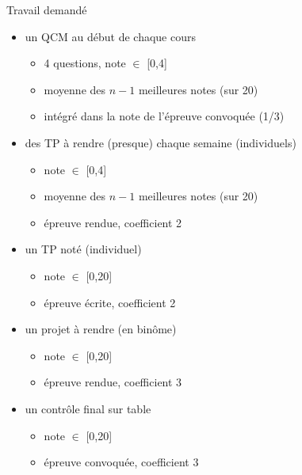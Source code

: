\begin {frame} {Travail demandé}
    \begin {itemize}
	\item un QCM au début de chaque cours
	    \begin {itemize}
		\item 4 questions, note $\in$ [0,4]
		\item moyenne des $n-1$ meilleures notes (sur 20)
		\item intégré dans la note de l'épreuve convoquée (1/3)
	    \end {itemize}
	\item des TP à rendre (presque) chaque semaine (individuels)
	    \begin {itemize}
		\item note $\in$ [0,4]
		\item moyenne des $n-1$ meilleures notes (sur 20)
		\item épreuve rendue, coefficient 2
	    \end {itemize}
	\item un TP noté (individuel)
	    \begin {itemize}
		\item note $\in$ [0,20]
		\item épreuve écrite, coefficient 2
	    \end {itemize}
	\item un projet à rendre (en binôme)
	    \begin {itemize}
		\item note $\in$ [0,20]
		\item épreuve rendue, coefficient 3
	    \end {itemize}
	\item un contrôle final sur table
	    \begin {itemize}
		\item note $\in$ [0,20]
		\item épreuve convoquée, coefficient 3
	    \end {itemize}
    \end {itemize}
\end {frame}

